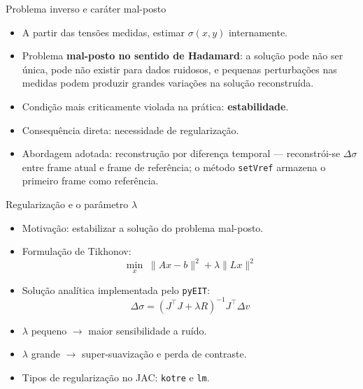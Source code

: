 \documentclass[aspectratio=169]{beamer}
\newcommand{\highlightterm}[1]{\textcolor{UFABCGreen}{\textbf{#1}}}
\begin{document}
\begin{frame}{Problema inverso e caráter mal-posto}
\begin{tcolorbox}[ufabcbox,title=Reconstrução interna a partir de medidas de fronteira]
\begin{itemize}
  \item A partir das tensões medidas, estimar $\sigma(x,y)$ internamente.
  \item Problema \highlightterm{mal-posto no sentido de Hadamard}: a solução pode não ser única, pode não existir para dados ruidosos, e pequenas perturbações nas medidas podem produzir grandes variações na solução reconstruída.
  \item Condição mais criticamente violada na prática: \textbf{estabilidade}.
  \item Consequência direta: necessidade de regularização.
  \item Abordagem adotada: reconstrução por diferença temporal — reconstrói-se $\Delta\sigma$ entre frame atual e frame de referência; o método \texttt{setVref} armazena o primeiro frame como referência.
\end{itemize}
\end{tcolorbox}

\end{frame}

\begin{frame}{Regularização e o parâmetro $\lambda$}
\begin{tcolorbox}[ufabcbox,title=Por que regularizar?]
\footnotesize
\begin{itemize}\setlength{\itemsep}{2pt}\setlength{\parskip}{0pt}\setlength{\topsep}{2pt}
  \item Motivação: estabilizar a solução do problema mal-posto.
  \item Formulação de Tikhonov:
  \[
  \min_x \; \lVert Ax - b \rVert^2 + \lambda \lVert Lx \rVert^2
  \]
  \item Solução analítica implementada pelo \texttt{pyEIT}:
  \[
  \Delta\sigma = (J^\top J + \lambda R)^{-1} J^\top \Delta v
  \]
  \item $\lambda$ pequeno $\rightarrow$ maior sensibilidade a ruído.
  \item $\lambda$ grande $\rightarrow$ super-suavização e perda de contraste.
  \item Tipos de regularização no JAC: \texttt{kotre} e \texttt{lm}.
\end{itemize}
\end{tcolorbox}
\end{frame}
\end{document}
